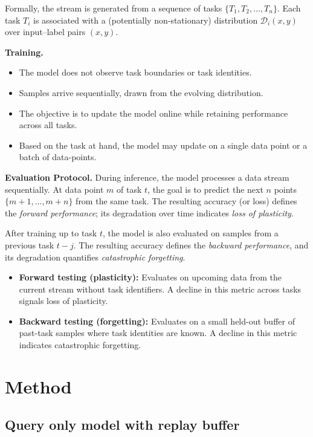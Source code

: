 \documentclass{article}
\begin{document}
Formally, the stream is generated from a sequence of tasks 
\(\{T_1, T_2, \dots, T_n\}\). Each task \(T_i\) is associated with a (potentially non-stationary) distribution \(\mathcal{D}_i(x,y)\) over input–label pairs \((x,y)\).  

\textbf{Training.}
\begin{itemize}
    \item The model does not observe task boundaries or task identities.
    \item Samples arrive sequentially, drawn from the evolving distribution.
    \item The objective is to update the model online while retaining performance across all tasks.
    \item Based on the task at hand, the model may update on a single data point or a batch of data-points.
\end{itemize}



\noindent
\textbf{Evaluation Protocol.} 
During inference, the model processes a data stream sequentially. 
At data point \(m\) of task \(t\), the goal is to predict the next \(n\) points 
\(\{m+1, \dots, m+n\}\) from the same task. 
The resulting accuracy (or loss) defines the \textit{forward performance}; 
its degradation over time indicates \textit{loss of plasticity}. 

After training up to task \(t\), the model is also evaluated on samples from a previous task \(t-j\). 
The resulting accuracy defines the \textit{backward performance}, 
and its degradation quantifies \textit{catastrophic forgetting}. 

\begin{itemize}
    \item \textbf{Forward testing (plasticity):} 
    Evaluates on upcoming data from the current stream without task identifiers. 
    A decline in this metric across tasks signals loss of plasticity.
    
    \item \textbf{Backward testing (forgetting):} 
    Evaluates on a small held-out buffer of past-task samples where task identities are known. 
    A decline in this metric indicates catastrophic forgetting.
\end{itemize}


\section{Method}
\subsection{Query only model with replay buffer}
\label{sec:method}
\end{document}
